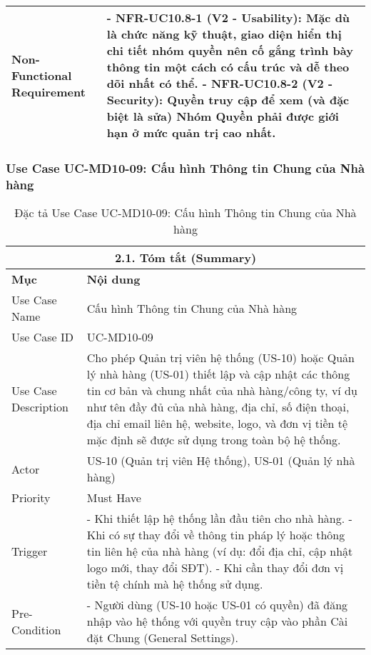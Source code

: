 \begin{longtable}{|m{4cm}|p{11cm}|}
\hline
Non-Functional Requirement & - \textbf{NFR-UC10.8-1 (V2 - Usability):} Mặc dù là chức năng kỹ thuật, giao diện hiển thị chi tiết nhóm quyền nên cố gắng trình bày thông tin một cách có cấu trúc và dễ theo dõi nhất có thể. \newline - \textbf{NFR-UC10.8-2 (V2 - Security):} Quyền truy cập để xem (và đặc biệt là sửa) Nhóm Quyền phải được giới hạn ở mức quản trị cao nhất. \\
\hline
\end{longtable}

\subsubsection{Use Case UC-MD10-09: Cấu hình Thông tin Chung của Nhà hàng}
\begin{longtable}{|m{4cm}|p{11cm}|}
\caption{Đặc tả Use Case UC-MD10-09: Cấu hình Thông tin Chung của Nhà hàng} \label{tab:uc_md10_09_full_v2_latex_fixed_in_codeblock} \\
\hline
\multicolumn{2}{|c|}{\textbf{2.1. Tóm tắt (Summary)}} \\
\hline
\textbf{Mục} & \textbf{Nội dung} \\
\hline
\endhead %
\midrule
\endfoot %
\bottomrule
\endlastfoot %
Use Case Name & Cấu hình Thông tin Chung của Nhà hàng \\
\hline
Use Case ID & UC-MD10-09 \\
\hline
Use Case Description & Cho phép Quản trị viên hệ thống (US-10) hoặc Quản lý nhà hàng (US-01) thiết lập và cập nhật các thông tin cơ bản và chung nhất của nhà hàng/công ty, ví dụ như tên đầy đủ của nhà hàng, địa chỉ, số điện thoại, địa chỉ email liên hệ, website, logo, và đơn vị tiền tệ mặc định sẽ được sử dụng trong toàn bộ hệ thống. \\
\hline
Actor & US-10 (Quản trị viên Hệ thống), US-01 (Quản lý nhà hàng) \\
\hline
Priority & Must Have \\
\hline
Trigger & - Khi thiết lập hệ thống lần đầu tiên cho nhà hàng. \newline - Khi có sự thay đổi về thông tin pháp lý hoặc thông tin liên hệ của nhà hàng (ví dụ: đổi địa chỉ, cập nhật logo mới, thay đổi SĐT). \newline - Khi cần thay đổi đơn vị tiền tệ chính mà hệ thống sử dụng. \\
\hline
Pre-Condition & - Người dùng (US-10 hoặc US-01 có quyền) đã đăng nhập vào hệ thống với quyền truy cập vào phần Cài đặt Chung (General Settings). \\

\end{longtable}
